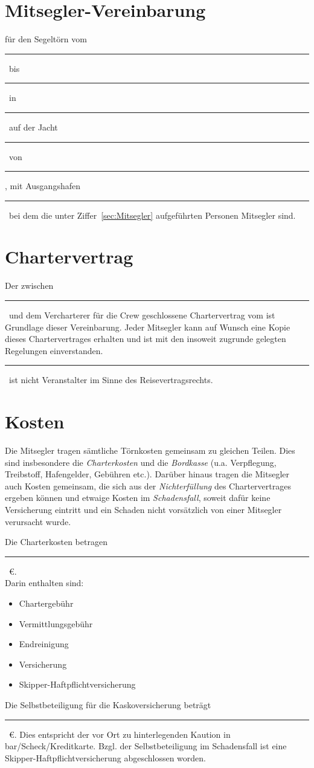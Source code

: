 \documentclass[a4paper,12pt]{article}
\newcommand{\openlength}[1]{\rule{#1}{.4pt}}
\newcommand{\openeuro}{\openlength{2cm}~\euro}
\newcommand{\open}{\openlength{3cm}}
\newcommand{\skipper}{\open}
\newcommand{\departdate}{\open}
\newcommand{\returndate}{\open}
\newcommand{\location}{\open}
\newcommand{\boatname}{\open}
\newcommand{\charteree}{\open}
\newcommand{\harbour}{\open}
\begin{document}
\section*{Mitsegler-Vereinbarung}

für den Segeltörn vom \departdate\ bis \returndate\ in \location\ auf der Jacht \boatname\ von \charteree, mit Ausgangshafen \harbour\ bei dem die unter Ziffer~\ref{sec:Mitsegler} aufgeführten Personen Mitsegler sind.


\section{Chartervertrag}
\label{sec:Chartervertrag}

Der zwischen \skipper\ und dem Vercharterer für die Crew geschlossene Chartervertrag vom ist Grundlage dieser Vereinbarung.
Jeder Mitsegler kann auf Wunsch eine Kopie dieses Chartervertrages erhalten und ist mit den insoweit zugrunde gelegten Regelungen einverstanden.
\skipper\ ist nicht Veranstalter im Sinne des Reisevertragsrechts.


\section{Kosten}
\label{sec:Kosten}

Die Mitsegler tragen sämtliche Törnkosten gemeinsam zu gleichen Teilen.
Dies sind insbesondere die \textit{Charterkosten} und die \textit{Bordkasse} (u.a. Verpflegung, Treibstoff, Hafengelder, Gebühren etc.).
Darüber hinaus tragen die Mitsegler auch Kosten gemeinsam, die sich aus der \textit{Nichterfüllung} des Chartervertrages ergeben können und etwaige Kosten im \textit{Schadensfall}, soweit dafür keine Versicherung eintritt und ein Schaden nicht vorsätzlich von einer Mitsegler verursacht wurde.


Die Charterkosten betragen \openeuro.\\
Darin enthalten sind:
\begin{itemize}
	\item Chartergebühr
	\item Vermittlungsgebühr
	\item Endreinigung
	\item Versicherung
	\item Skipper-Haftpflichtversicherung
\end{itemize}

Die Selbstbeteiligung für die Kaskoversicherung beträgt \openeuro.
Dies entspricht der vor Ort zu hinterlegenden Kaution in bar/Scheck/Kreditkarte.
Bzgl. der Selbstbeteiligung im Schadensfall ist eine Skipper-Haftpflichtversicherung abgeschlossen worden.
\end{document}
